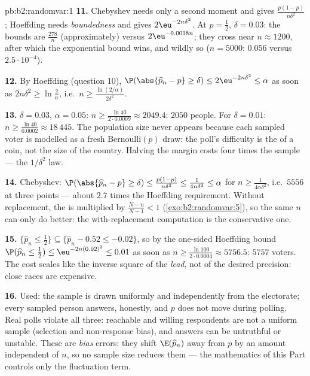 \begin{solution}{pb:b2:randomvar:1}
\textbf{11.} Chebyshev needs only a second moment and gives
$\frac{p(1-p)}{n\delta^2}$; Hoeffding needs
\emph{boundedness} and gives $2\eu^{-2n\delta^2}$. At $p =
\frac12$, $\delta = 0.03$: the bounds are
$\frac{278}{n}$ (approximately) versus
$2\eu^{-0.0018n}$; they cross near $n \approx 1200$, after
which the exponential bound wins, and wildly so ($n = 5000$:
$0.056$ versus $2.5\cdot10^{-4}$).

\textbf{12.} By Hoeffding (question 10), $\P(\abs{\widehat
p_n - p} \geq \delta) \leq 2\eu^{-2n\delta^2} \leq \alpha$ as
soon as $2n\delta^2 \geq \ln\frac2\alpha$, i.e.\ $n \geq
\frac{\ln(2/\alpha)}{2\delta^2}$.

\textbf{13.} $\delta = 0.03$, $\alpha = 0.05$: $n \geq
\frac{\ln 40}{2\cdot0.0009} \approx 2049.4$: $2050$ people.
For $\delta = 0.01$: $n \geq \frac{\ln40}{0.0002} \approx
18\,445$. The population size never appears because each
sampled voter is modelled as a fresh Bernoulli$(p)$ draw: the
poll's difficulty is the  of a coin, not the size of
the country. Halving the margin costs four times the sample
--- the $1/\delta^2$ law.

\textbf{14.} Chebyshev: $\P(\abs{\widehat p_n - p} \geq
\delta) \leq \frac{p(1-p)}{n\delta^2} \leq
\frac1{4n\delta^2} \leq \alpha$ for $n \geq
\frac1{4\alpha\delta^2}$, i.e.\ $5556$ at three points ---
about $2.7$ times the Hoeffding requirement. Without
replacement, the  is multiplied by $\frac{N -
n}{N-1} < 1$ (\cref{exo:b2:randomvar:5}), so the same $n$ can
only do better: the with-replacement computation is the
conservative one.

\textbf{15.} $\{\widehat p_n \leq \frac12\} \subseteq
\{\widehat p_n - 0.52 \leq -0.02\}$, so by the one-sided
Hoeffding bound $\P(\widehat p_n \leq \tfrac12) \leq
\eu^{-2n(0.02)^2} \leq 0.01$ as soon as $n \geq \frac{\ln
100}{2\cdot0.0004} \approx 5756.5$: $5757$ voters. The cost
scales like the inverse square of the \emph{lead}, not of the
desired precision: close races are expensive.

\textbf{16.} Used: the sample is drawn uniformly and
independently from the electorate; every sampled person
answers, honestly, and $p$ does not move during polling. Real
polls violate all three: reachable and willing respondents
are not a uniform sample (selection and non-response bias),
and answers can be untruthful or unstable. These are
\emph{bias} errors: they shift $\E(\widehat p_n)$ away from
$p$ by an amount independent of $n$, so no sample size
reduces them --- the mathematics of this Part controls only
the fluctuation term.


\end{solution}
